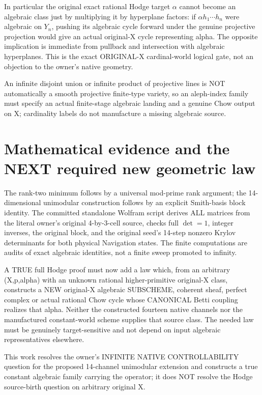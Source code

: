 \documentclass[11pt]{article}
\begin{document}
In particular the original exact rational
Hodge target \(\alpha\) cannot become an
algebraic class just by multiplying it
by hyperplane factors:
if \(\alpha h_1\cdots h_n\) were algebraic
on \(Y_n\), pushing its algebraic cycle
forward under the genuine projective
projection would give an actual original-X
cycle representing alpha.
The opposite implication is immediate
from pullback and intersection with
algebraic hyperplanes.
This is the exact ORIGINAL-X cardinal-world
logical gate, not an objection to
the owner's native geometry.

An infinite disjoint union or infinite
product of projective lines is NOT
automatically a smooth projective
finite-type variety, so an aleph-index
family must specify an actual
finite-stage algebraic landing
and a genuine Chow output on X;
cardinality labels do not manufacture
a missing algebraic source.

\section{Mathematical evidence and the NEXT required new geometric law}
The rank-two minimum follows by a
universal mod-prime rank argument;
the 14-dimensional unimodular
construction follows by an explicit
Smith-basis block identity.
The committed standalone Wolfram
script derives ALL matrices from the
literal owner's original 4-by-3-cell
source, checks full \(\det=1\),
integer inverses, the original block,
and the original seed's 14-step
nonzero Krylov determinants for
both physical Navigation states.
The finite computations are audits
of exact algebraic identities, not
a finite sweep promoted to infinity.

A TRUE full Hodge proof must now add
a law which, from an arbitrary
(X,p,alpha) with an unknown rational
higher-primitive original-X class,
constructs a NEW original-X
algebraic SUBSCHEME, coherent sheaf,
perfect complex or actual rational
Chow cycle whose CANONICAL Betti
coupling realizes that alpha.
Neither the constructed fourteen
native channels nor the manufactured
constant-world scheme supplies
that source class. The needed law
must be genuinely target-sensitive
and not depend on input algebraic
representatives elsewhere.

This work resolves the owner's
INFINITE NATIVE CONTROLLABILITY question
for the proposed 14-channel
unimodular extension and constructs
a true constant algebraic family
carrying the operator; it does NOT
resolve the Hodge source-birth
question on arbitrary original X.
\end{document}
